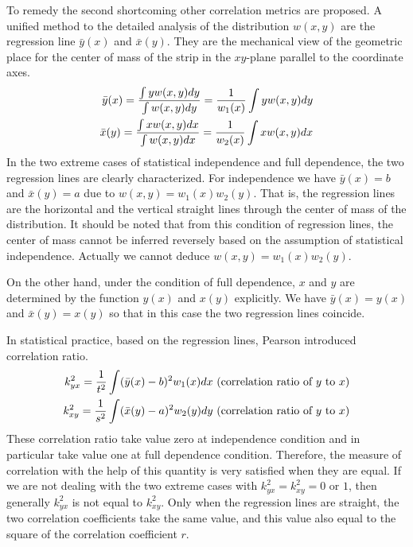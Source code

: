 \documentclass{article}
\begin{document}
To remedy the second shortcoming other correlation metrics are proposed.
A unified method to the detailed analysis of the distribution $w(x,y)$ are the regression line $\bar{y}(x)$ and $\bar{x}(y)$.
They are the mechanical view of the geometric place for the center of mass of the strip in
the $xy$-plane parallel to the coordinate axes.
\begin{align}
   \bar{y}(x) = \frac{\int y w(x,y) dy}{\int w(x,y) dy} = \frac{1}{w_1(x)} \int y w(x, y)dy \notag \\
   \bar{x}(y) =  \frac{\int x w(x,y) dx}{\int w(x,y) dx} = \frac{1}{w_2(x)} \int x w(x, y)dx 
\end{align}
In the two extreme cases of statistical independence and
full dependence, the two regression lines are clearly
characterized. For independence we have $\bar{y}(x) = b$
and $\bar{x}(y)=a$ due to $w(x,y) = w_1(x)w_2(y)$.
That is, the regression lines are the horizontal and
the vertical straight lines through the center of mass of the
distribution. It should be noted that from this condition of regression lines,
the center of mass cannot be inferred reversely based on the assumption of statistical independence.
Actually we cannot deduce $w(x,y)=w_1(x)w_2(y)$.

On the other hand, under
the condition of full dependence, $x$ and
$y$ are determined by the function $y(x)$
and $x(y)$ explicitly. We have $\bar{y}(x) = y(x)$
and $\bar{x}(y) = x(y)$ so that in this case
the two regression lines coincide.

In statistical practice, based on the regression lines,
Pearson introduced \textsf{correlation ratio}.
\begin{align}
   k^2_{yx} = \frac{1}{t^2}\int (\bar{y}(x) - b)^2 w_1(x)dx \textrm{ (correlation ratio of $y$ to $x$}) \notag \\
   k^2_{xy} = \frac{1}{s^2}\int (\bar{x}(y) - a)^2 w_2(y)dy \textrm{ (correlation ratio of $y$ to $x$})
\end{align}
These correlation ratio take value zero at independence
condition and in particular take value one at full
dependence condition. Therefore, the measure of correlation with the help of this quantity is very satisfied when they are equal. If we are not dealing with the two extreme
cases with $k^2_{yx} = k^2_{xy}=0$ or $1$, then
generally $k^2_{yx}$ is not equal to $k^2_{xy}$. Only when the regression lines are straight, the two correlation coefficients take the same value, and this
value also equal to the square of the correlation
coefficient $r$.
\end{document}
